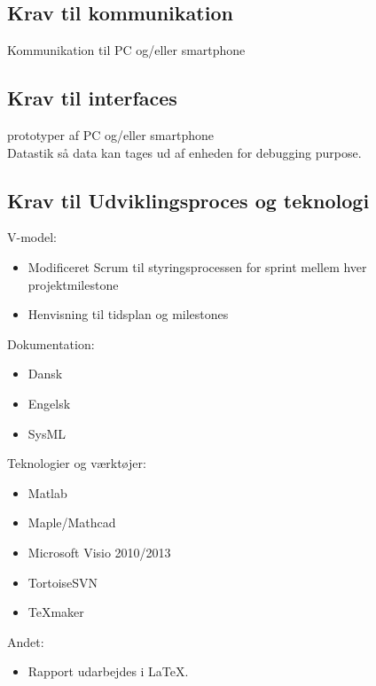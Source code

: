 \subsection{Krav til kommunikation}
Kommunikation til PC og/eller smartphone

\subsection{Krav til interfaces}
prototyper af PC og/eller smartphone\\
Datastik så data kan tages ud af enheden for debugging purpose.\\

\subsection{Krav til Udviklingsproces og teknologi}
V-model:\\
\begin{itemize}
\item Modificeret Scrum til styringsprocessen for sprint mellem hver projektmilestone
\item Henvisning til tidsplan og milestones
\end{itemize}

Dokumentation:\\
\begin{itemize}
\item Dansk
\item Engelsk
\item SysML
\end{itemize}

Teknologier og værktøjer:\\
\begin{itemize}
\item Matlab
\item Maple/Mathcad
\item Microsoft Visio 2010/2013
\item TortoiseSVN
\item TeXmaker
\end{itemize}

Andet:\\
\begin{itemize}
\item Rapport udarbejdes i LaTeX.
\end{itemize}
